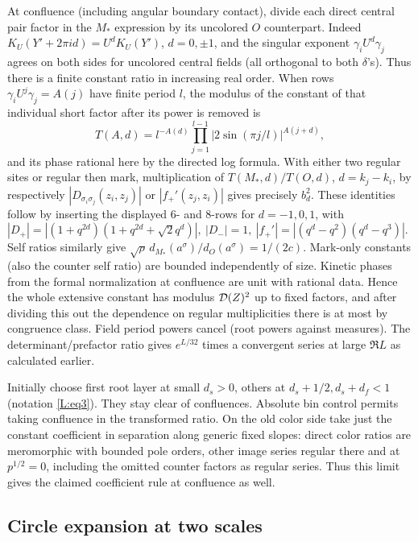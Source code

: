 \documentclass[11pt]{article}
\numberwithin{equation}{section}
\theoremstyle{definition}\newtheorem{definition}[theorem]{Definition}
\theoremstyle{remark}\newtheorem{remark}[theorem]{Remark}
\begin{document}
At confluence (including angular boundary contact), divide each direct central pair factor in the \(M_*\) expression by its uncolored \(O\) counterpart. Indeed \(K_U(Y'+2\pi i d)=U^dK_U(Y')\), \(d=0,\pm1\), and the singular exponent \(\gamma_i U^d\gamma_j\) agrees on both sides for uncolored central fields (all orthogonal to both \(\delta\)'s). Thus there is a finite constant ratio in increasing real order. When rows \(\gamma_i U^j\gamma_j=A(j)\) have finite period \(l\), the modulus of the constant of that individual short factor after its power is removed is
\[
 T(A,d)=l^{-A(d)}\prod_{j=1}^{l-1}|2\sin(\pi j/l)|^{A(j+d)},
\]
and its phase rational here by the directed log formula. With either two regular sites or regular then mark, multiplication of \(T(M_*,d)/T(O,d)\), \(d=k_j-k_i\), by respectively \(|D_{\sigma_i\sigma_j}(z_i,z_j)|\) or \(|f_+'(z_j,z_i)|\) gives precisely \(b_d^2\). These identities follow by inserting the displayed 6- and 8-rows for \(d=-1,0,1\), with \(|D_+|=|(1+q^{2d})(1+q^{2d}+\sqrt2 q^d)|,\ |D_-|=1,\ |f_+'|=|(q^d-q^2)(q^d-q^3)|\). Self ratios similarly give \(\sqrt\rho\, d_{M_*}(a^\sigma)/d_O(a^\sigma)=1/(2c)\). Mark-only constants (also the counter self ratio) are bounded independently of size. Kinetic phases from the formal normalization at confluence are unit with rational data. Hence the whole extensive constant has modulus \({\cal D}(Z)^2\) up to fixed factors, and after dividing this out the dependence on regular multiplicities there is at most by congruence class. Field period powers cancel (root powers against measures). The determinant/prefactor ratio gives \(e^{L/32}\) times a convergent series at large \(\Re L\) as calculated earlier.

Initially choose first root layer at small \(d_s>0\), others at \(d_s+1/2,d_s+d_f<1\) (notation \eqref{L:eq3}). They stay clear of confluences. Absolute bin control permits taking confluence in the transformed ratio. On the old color side take just the constant coefficient in separation along generic fixed slopes: direct color ratios are meromorphic with bounded pole orders, other image series regular there and at \(p^{1/2}=0\), including the omitted counter factors as regular series. Thus this limit gives the claimed coefficient rule at confluence as well.


\subsection{Circle expansion at two scales}\label{L:step15}
\end{document}
